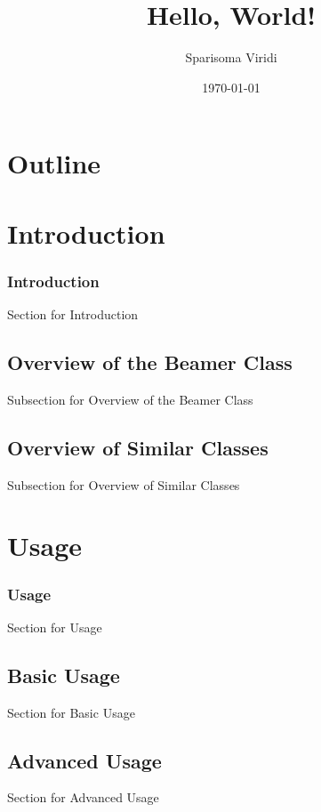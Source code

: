 \documentclass{beamer}
\title{Hello, World!}
\author{Sparisoma Viridi}
\date{\today}
\institute{Asosiasi Ilmuwan Data Indonesia}
\begin{document}
\begin{frame}
\titlepage
\end{frame}

\section*{Outline}

\begin{frame}
\tableofcontents
\end{frame}

\section{Introduction}
\begin{frame}
\frametitle{Introduction}
Section for Introduction
\end{frame}

\subsection{Overview of the Beamer Class}
\begin{frame}
Subsection for Overview of the Beamer Class
\end{frame}

\subsection{Overview of Similar Classes}
\begin{frame}
Subsection for Overview of Similar Classes
\end{frame}


\section{Usage}
\begin{frame}
\frametitle{Usage}
Section for Usage
\end{frame}

\subsection{Basic Usage}
\begin{frame}
Section for Basic Usage
\end{frame}

\subsection{Advanced Usage}
\begin{frame}
Section for Advanced Usage
\end{frame}
\end{document}
